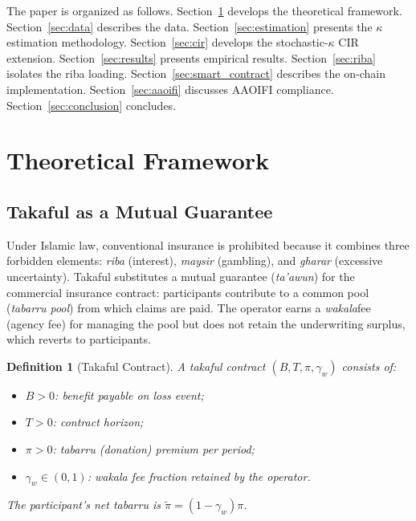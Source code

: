 \documentclass[12pt,a4paper]{article}
\newtheorem{definition}{Definition}[section]
\newcommand{\tabarru}{\textit{tabarru}}
\newcommand{\wakala}{\textit{wakala}}
\begin{document}
The paper is organized as follows.
Section~\ref{sec:theory} develops the theoretical framework.
Section~\ref{sec:data} describes the data.
Section~\ref{sec:estimation} presents the $\kappa$ estimation methodology.
Section~\ref{sec:cir} develops the stochastic-$\kappa$ CIR extension.
Section~\ref{sec:results} presents empirical results.
Section~\ref{sec:riba} isolates the riba loading.
Section~\ref{sec:smart_contract} describes the on-chain implementation.
Section~\ref{sec:aaoifi} discusses AAOIFI compliance.
Section~\ref{sec:conclusion} concludes.

\section{Theoretical Framework}
\label{sec:theory}

\subsection{Takaful as a Mutual Guarantee}

Under Islamic law, conventional insurance is prohibited because it combines three
forbidden elements: \textit{riba} (interest), \textit{maysir} (gambling), and
\textit{gharar} (excessive uncertainty).
Takaful substitutes a mutual guarantee (\textit{ta'awun}) for the commercial
insurance contract: participants contribute to a common pool (\textit{tabarru pool})
from which claims are paid.
The operator earns a \wakala fee (agency fee) for managing the pool but does not
retain the underwriting surplus, which reverts to participants.

\begin{definition}[Takaful Contract]
A takaful contract $(B,T,\pi,\gamma_w)$ consists of:
\begin{itemize}
  \item $B>0$: benefit payable on loss event;
  \item $T>0$: contract horizon;
  \item $\pi>0$: \tabarru{} (donation) premium per period;
  \item $\gamma_w \in (0,1)$: \wakala{} fee fraction retained by the operator.
\end{itemize}
The participant's net \tabarru{} is $\tilde{\pi} = (1-\gamma_w)\pi$.
\end{definition}
\end{document}
